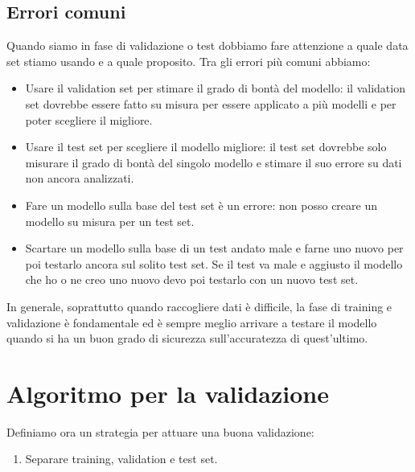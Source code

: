 \subsection{Errori comuni}
Quando siamo in fase di validazione o test dobbiamo fare attenzione a quale data set stiamo usando e a quale proposito. Tra
gli errori pi\`u comuni abbiamo:
\begin{itemize}
	\item Usare il validation set per stimare il grado di bont\`a del modello: il validation set dovrebbe essere fatto
	      su misura per essere applicato a pi\`u modelli e per poter scegliere il migliore.
	\item Usare il test set per scegliere il modello migliore: il test set dovrebbe solo misurare il grado di bont\`a del
	      singolo modello e stimare il suo errore su dati non ancora analizzati.
	\item Fare un modello sulla base del test set \`e un errore: non posso creare un modello su misura per un test set.
	\item Scartare un modello sulla base di un test andato male e farne uno nuovo per poi testarlo ancora sul solito test
	      set. Se il test va male e aggiusto il modello che ho o ne creo uno nuovo devo poi testarlo con un nuovo test set.
\end{itemize}
In generale, soprattutto quando raccogliere dati \`e difficile, la fase di training e validazione \`e fondamentale ed \`e
sempre meglio arrivare a testare il modello quando si ha un buon grado di sicurezza sull'accuratezza di quest'ultimo.

\section{Algoritmo per la validazione}
Definiamo ora un strategia per attuare una buona validazione:
\begin{enumerate}
	\item Separare training, validation e test set.
\end{enumerate}